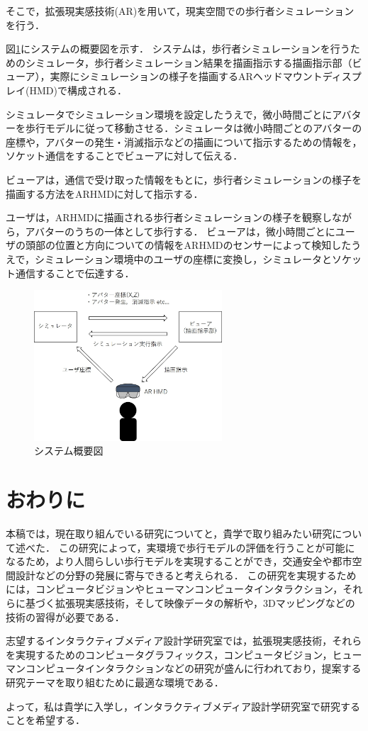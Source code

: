 \documentclass[twocolumn]{jarticle}%
\begin{document}
そこで，拡張現実感技術(AR)を用いて，現実空間での歩行者シミュレーションを行う．

図\ref{fig:systemImage}にシステムの概要図を示す．
システムは，歩行者シミュレーションを行うためのシミュレータ，歩行者シミュレーション結果を描画指示する描画指示部（ビューア），実際にシミュレーションの様子を描画するARヘッドマウントディスプレイ(HMD)で構成される．

シミュレータでシミュレーション環境を設定したうえで，微小時間ごとにアバターを歩行モデルに従って移動させる．シミュレータは微小時間ごとのアバターの座標や，アバターの発生・消滅指示などの描画について指示するための情報を，ソケット通信をすることでビューアに対して伝える．

ビューアは，通信で受け取った情報をもとに，歩行者シミュレーションの様子を描画する方法をARHMDに対して指示する．

ユーザは，ARHMDに描画される歩行者シミュレーションの様子を観察しながら，アバターのうちの一体として歩行する．
ビューアは，微小時間ごとにユーザの頭部の位置と方向についての情報をARHMDのセンサーによって検知したうえで，シミュレーション環境中のユーザの座標に変換し，シミュレータとソケット通信することで伝達する．

\begin{figure}[htbp]
  \begin{center}
    \includegraphics[width=70mm]{images/systemImage.jpg}
  \end{center}
    \caption{システム概要図}
    \label{fig:systemImage}
\end{figure}

\vspace{-2mm}
\section{おわりに}
本稿では，現在取り組んでいる研究についてと，貴学で取り組みたい研究について述べた．
この研究によって，実環境で歩行モデルの評価を行うことが可能になるため，より人間らしい歩行モデルを実現することができ，交通安全や都市空間設計などの分野の発展に寄与できると考えられる．
この研究を実現するためには，コンピュータビジョンやヒューマンコンピュータインタラクション，それらに基づく拡張現実感技術，そして映像データの解析や，3Dマッピングなどの技術の習得が必要である．

志望するインタラクティブメディア設計学研究室では，拡張現実感技術，それらを実現するためのコンピュータグラフィックス，コンピュータビジョン，ヒューマンコンピュータインタラクションなどの研究が盛んに行われており，提案する研究テーマを取り組むために最適な環境である．

よって，私は貴学に入学し，インタラクティブメディア設計学研究室で研究することを希望する．

\vspace{-2mm}




\end{document}
